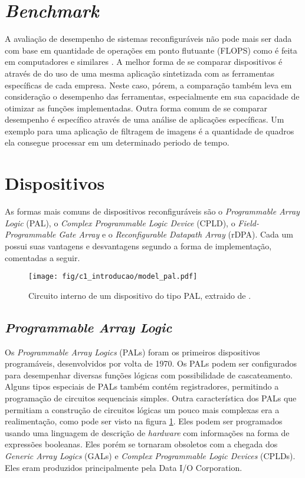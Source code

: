 \documentclass[11pt,a4paper,oneside]{book}
\begin{document}
\section{\textit{Benchmark}}
A avaliação de desempenho de sistemas reconfiguráveis não pode mais ser dada com base em quantidade de operações em ponto flutuante (FLOPS) como é feita em computadores e similares \cite{patterson2005coa, cullinan2012computing}.
A melhor forma de se comparar dispositivos é através de do uso de uma mesma aplicação sintetizada com as ferramentas específicas de cada empresa.
Neste caso, pórem, a comparação também leva em consideração o desempenho das ferramentas, especialmente em sua capacidade de otimizar as funções implementadas.
Outra forma comum de se comparar desempenho é específico através de uma análise de aplicações específicas.
Um exemplo para uma aplicação de filtragem de imagens é a quantidade de quadros ela consegue processar em um determinado periodo de tempo.

\section{Dispositivos}
As formas mais comuns de dispositivos reconfigur\'aveis s\~ao o \textit{Programmable Array Logic} (PAL), o \textit{Complex Programmable Logic Device} (CPLD), o \textit{Field-Programmable Gate Array} e o \textit{Reconfigurable Datapath Array} (rDPA).
Cada um possui suas vantagens e desvantagens segundo a forma de implementa\c{c}\~ao, comentadas a seguir.

\begin{figure}[h]
\centering
\texttt{[image: fig/c1\_introducao/model\_pal.pdf]}
\caption{Circuito interno de um dispositivo do tipo PAL, extraido de \cite{Ashenden2008}.}
\label{fig:pal}
\end{figure}

\subsection{\textit{Programmable Array Logic}}
Os \textit{Programmable Array Logics} (PALs) foram os primeiros dispositivos program\'aveis, desenvolvidos por volta de 1970.
Os PALs podem ser configurados para desempenhar diversas fun\c{c}\~oes l\'ogicas com possibilidade de cascateamento.
Alguns tipos especiais de PALs tamb\'em cont\'em registradores, permitindo a programa\c{c}\~ao de circuitos sequenciais simples.
Outra caracter\'i­stica dos PALs que permitiam a constru\c{c}\~ao de circuitos l\'ogicas um pouco mais complexas era a realimenta\c{c}\~ao, como pode ser visto na figura \ref{fig:pal}.
Eles podem ser programados usando uma linguagem de descri\c{c}\~ao de \textit{hardware} com informa\c{c}\~oes na forma de express\~oes booleanas.
Eles por\'em se tornaram obsoletos com a chegada dos \textit{Generic Array Logics} (GALs) e \textit{Complex Programmable Logic Devices} (CPLDs).
Eles eram produzidos principalmente pela Data I/O Corporation.
\end{document}

